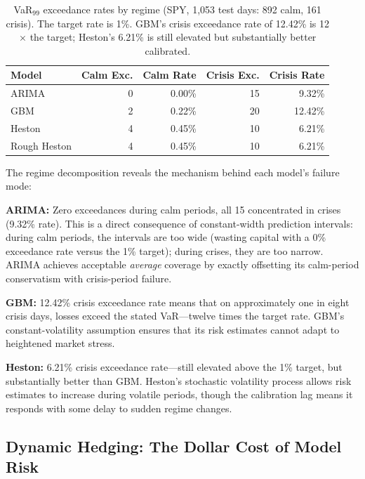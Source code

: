 \documentclass[11pt,a4paper]{article}
\begin{document}
\begin{table}[H]
\centering
\caption{VaR$_{99}$ exceedance rates by regime (SPY, 1{,}053 test days: 892 calm, 161 crisis). The target rate is 1\%. GBM's crisis exceedance rate of 12.42\% is 12$\times$ the target; Heston's 6.21\% is still elevated but substantially better calibrated.}
\label{tab:regime}
\small
\begin{tabular}{@{}lrrrr@{}}
\toprule
\textbf{Model} & \textbf{Calm Exc.} & \textbf{Calm Rate} & \textbf{Crisis Exc.} & \textbf{Crisis Rate} \\
\midrule
ARIMA        & 0  & 0.00\%  & 15 & 9.32\%  \\
GBM          & 2  & 0.22\%  & 20 & 12.42\% \\
Heston       & 4  & 0.45\%  & 10 & 6.21\%  \\
Rough Heston & 4  & 0.45\%  & 10 & 6.21\%  \\
\bottomrule
\end{tabular}
\end{table}

The regime decomposition reveals the mechanism behind each model's failure mode:

\textbf{ARIMA:} Zero exceedances during calm periods, all 15 concentrated in crises (9.32\% rate).
This is a direct consequence of constant-width prediction intervals: during calm periods, the intervals are too wide (wasting capital with a 0\% exceedance rate versus the 1\% target); during crises, they are too narrow.
ARIMA achieves acceptable \emph{average} coverage by exactly offsetting its calm-period conservatism with crisis-period failure.

\textbf{GBM:} 12.42\% crisis exceedance rate means that on approximately one in eight crisis days, losses exceed the stated VaR---twelve times the target rate.
GBM's constant-volatility assumption ensures that its risk estimates cannot adapt to heightened market stress.

\textbf{Heston:} 6.21\% crisis exceedance rate---still elevated above the 1\% target, but substantially better than GBM.
Heston's stochastic volatility process allows risk estimates to increase during volatile periods, though the calibration lag means it responds with some delay to sudden regime changes.

\subsection{Dynamic Hedging: The Dollar Cost of Model Risk}
\label{sec:hedging}
\end{document}
